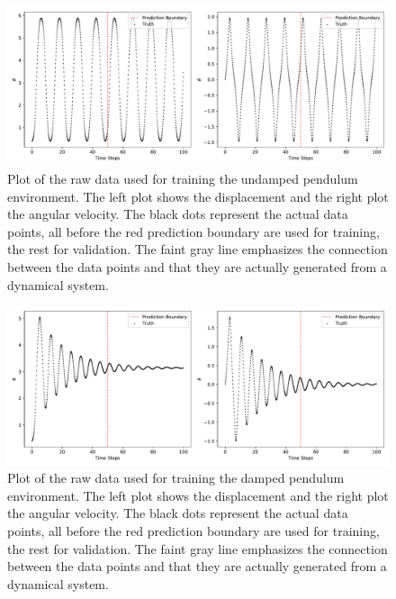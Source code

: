 			\begin{figure}
				\centering
				\includegraphics[width=\linewidth]{figures/experiments/environments/observations-pendulum-N0.pdf}
				\caption[Raw data of the undamped pendulum environment]{Plot of the raw data used for training the undamped pendulum environment. The left plot shows the displacement and the right plot the angular velocity. The black dots represent the actual data points, all before the red prediction boundary are used for training, the rest for validation. The faint gray line emphasizes the connection between the data points and that they are actually generated from a dynamical system.}
				\label{fig:envPendulum}
			\end{figure}
			\begin{figure}
				\centering
				\includegraphics[width=\linewidth]{figures/experiments/environments/observations-pendulum-damped-N0.pdf}
				\caption[Raw data of the damped pendulum environment]{Plot of the raw data used for training the damped pendulum environment. The left plot shows the displacement and the right plot the angular velocity. The black dots represent the actual data points, all before the red prediction boundary are used for training, the rest for validation. The faint gray line emphasizes the connection between the data points and that they are actually generated from a dynamical system.}
				\label{fig:envPendulumDamped}
			\end{figure}

